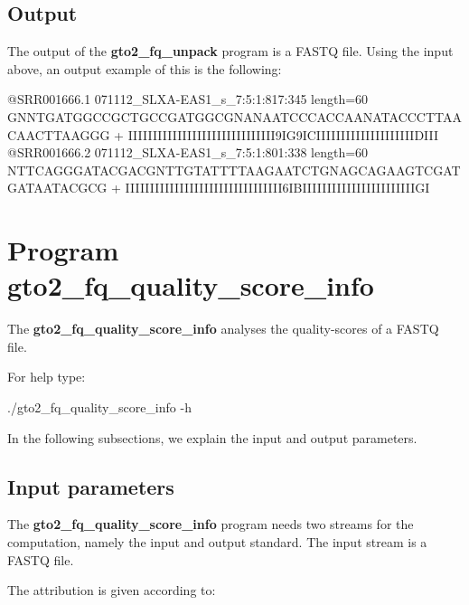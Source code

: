 \documentclass[11pt,]{krantz}
\newenvironment{Shaded}{\begin{snugshade}}{\end{snugshade}}
\newcommand{\ExtensionTok}[1]{#1}
\newcommand{\NormalTok}[1]{#1}
\begin{document}
\subsection*{Output}\label{output-13}


The output of the \textbf{gto2\_fq\_unpack} program is a FASTQ file.
Using the input above, an output example of this is the following:

\begin{Shaded}
\begin{Highlighting}[]
\ExtensionTok{@SRR001666.1}\NormalTok{ 071112_SLXA-EAS1_s_7:5:1:817:345 length=60}
\ExtensionTok{GNNTGATGGCCGCTGCCGATGGCGNANAATCCCACCAANATACCCTTAACAACTTAAGGG}
\ExtensionTok{+}
\ExtensionTok{IIIIIIIIIIIIIIIIIIIIIIIIIIIIII9IG9ICIIIIIIIIIIIIIIIIIIIIDIII}
\ExtensionTok{@SRR001666.2}\NormalTok{ 071112_SLXA-EAS1_s_7:5:1:801:338 length=60}
\ExtensionTok{NTTCAGGGATACGACGNTTGTATTTTAAGAATCTGNAGCAGAAGTCGATGATAATACGCG}
\ExtensionTok{+}
\ExtensionTok{IIIIIIIIIIIIIIIIIIIIIIIIIIIIIIII6IBIIIIIIIIIIIIIIIIIIIIIIIGI}
\end{Highlighting}
\end{Shaded}

\section{Program
gto2\_fq\_quality\_score\_info}\label{program-gto2_fq_quality_score_info}

The \textbf{gto2\_fq\_quality\_score\_info} analyses the quality-scores
of a FASTQ file.

For help type:

\begin{Shaded}
\begin{Highlighting}[]
\ExtensionTok{./gto2_fq_quality_score_info}\NormalTok{ -h}
\end{Highlighting}
\end{Shaded}

In the following subsections, we explain the input and output
parameters.

\subsection*{Input parameters}\label{input-parameters-14}


The \textbf{gto2\_fq\_quality\_score\_info} program needs two streams
for the computation, namely the input and output standard. The input
stream is a FASTQ file.

The attribution is given according to:
\end{document}
